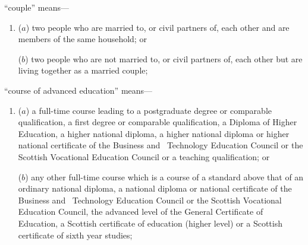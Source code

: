 \documentclass[12pt,a4paper]{article}
\begin{document}
\begin{enumerate}

%
%
%

“couple” means—
\begin{enumerate}\item[]
($a$) 
two people who are married to, or civil partners of, each other and are members of the same household; or

($b$) 
two people who are not married to, or civil partners of, each other but are living together as a married couple;
\end{enumerate}

“course of advanced education” means---
\begin{enumerate}\item[]
($a$)
a full-time course leading to a postgraduate degree or comparable qualification, a first degree or comparable qualification, a Diploma of Higher Education, a higher national diploma, a higher national diploma or higher national certificate of the Business and~
Technology %
Education Council or the Scottish Vocational Education Council or a teaching qualification; or

($b$)
any other full-time course which is a course of a standard above that of an ordinary national diploma, a national diploma or national certificate of the Business and~
Technology %
Education Council or the Scottish Vocational Education Council, the advanced level of the General Certificate of Education, a Scottish certificate of education (higher level) or a Scottish certificate of sixth year studies;
\end{enumerate}


\end{enumerate}
\end{document}
